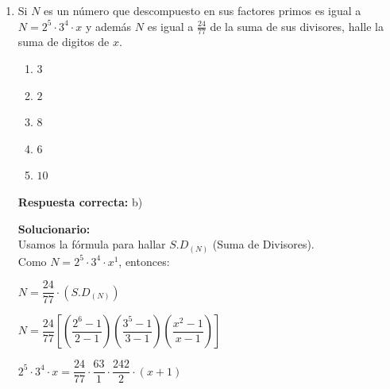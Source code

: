 \begin{enumerate}
	\textbf{Respuesta correcta:} d)
	
	\vspace{2mm}
	\textbf{Solucionario:}\\
	Sea el número: $\overline{1abcde}$ \\
	Dato: $\overline{abcde1} = 3(\overline{1abcde})$
	
	Descomponiendo resulta:
	\begin{align*}
		10(\overline{abcde}) + 1 &= 3(10^5 + \overline{abcde}) \\
		10(\overline{abcde}) + 1 &= 300\,000 + 3(\overline{abcde}) \\
		7(\overline{abcde}) &= 300000 - 1 \\
		7(\overline{abcde}) &= 299999 \\
		\overline{abcde} &= 42857
	\end{align*}
	
	Piden $\overline{1abcde} $ 
	
	\vspace{6mm}
	
	\item Si $N$ es un número que descompuesto en sus factores primos es igual a $N = 2^5 \cdot 3^4 \cdot x$ y además $N$ es igual a $\frac{24}{77}$ de la suma de sus divisores, halle  la suma de digitos de $x$.
	
	\begin{enumerate}[label=\alph*)]
		\item $3$
		\item $2$
		\item $8$
		\item $6$
		\item $10$
	\end{enumerate}
	
	\textbf{Respuesta correcta:} b)
	
	\vspace{2mm}
	\textbf{Solucionario:}\\
	Usamos la fórmula para hallar $S.D_{(N)}$ (Suma de Divisores). \\
	Como $N = 2^5 \cdot 3^4 \cdot x^1$, entonces:
	
	$ N = \dfrac{24}{77} \cdot (S.D_{(N)}) $
	
	$N = \dfrac{24}{77} \left[ \left( \dfrac{2^6 - 1}{2 - 1} \right) \left( \dfrac{3^5 - 1}{3 - 1} \right) \left( \dfrac{x^2 - 1}{x - 1} \right) \right] $
	
		$2^5 \cdot 3^4 \cdot x = \dfrac{24}{77} \cdot \dfrac{63}{1} \cdot \dfrac{242}{2} \cdot (x + 1)$ \\
		

\end{enumerate}
